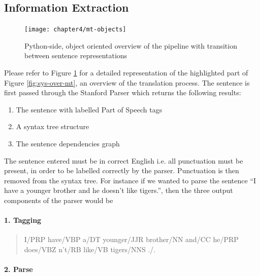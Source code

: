 \documentclass[12pt]{ociamthesis}  %
\begin{document}
\newpage
\subsection{Information Extraction}
\label{info-extraction}
\begin{figure}[h]
	\centering
    \texttt{[image: chapter4/mt-objects]}
    \caption[Python-side, object oriented overview of the pipeline]{Python-side, object oriented overview of the pipeline with transition between sentence representations}
    \label{fig:mt-objects}
\end{figure}	
Please refer to Figure \ref{fig:mt-objects} for a detailed representation of the highlighted part of Figure \ref{fig:sys-over-mt}, an overview of the translation process. The sentence is first passed through the Stanford Parser which returns the following results:
\begin{enumerate}
	\item The sentence with labelled Part of Speech tags
	\item A syntax tree structure
	\item The sentence dependencies graph
\end{enumerate}



The sentence entered must be in correct English i.e. all punctuation must be present, in order to be labelled correctly by the parser. Punctuation is then removed from the syntax tree. For instance if we wanted to parse the sentence ``I have a younger brother and he doesn't like tigers.'', then the three output components of the parser would be
\paragraph*{1. Tagging}
\begin{quote}
I/PRP have/VBP a/DT younger/JJR brother/NN and/CC he/PRP does/VBZ n't/RB like/VB tigers/NNS ./.
\end{quote}

\paragraph*{2. Parse}
\begin{quote}
\end{quote}
\end{document}
